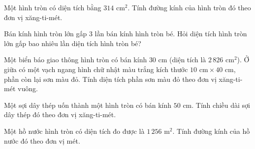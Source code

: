 \begin{ex} %
Một hình tròn có diện tích bằng $314\text{ cm}^2$. Tính đường kính của hình tròn đó theo đơn vị xăng-ti-mét.
\end{ex}

\begin{ex} %
Bán kính hình tròn lớn gấp $3$ lần bán kính hình tròn bé. Hỏi diện tích hình tròn lớn gấp bao nhiêu lần diện tích hình tròn bé?
\end{ex}

\begin{ex} %
Một biển báo giao thông hình tròn có bán kính $30\text{ cm}$ (diện tích là $2\,826\text{ cm}^2$). Ở giữa có một vạch ngang hình chữ nhật màu trắng kích thước $10\text{ cm} \times 40\text{ cm}$, phần còn lại sơn màu đỏ. Tính diện tích phần sơn màu đỏ theo đơn vị xăng-ti-mét vuông.
\end{ex}

\begin{ex} %
Một sợi dây thép uốn thành một hình tròn có bán kính $50\text{ cm}$. Tính chiều dài sợi dây thép đó theo đơn vị xăng-ti-mét.
\end{ex}

\begin{ex} %
Một hồ nước hình tròn có diện tích đo được là $1\,256\text{ m}^2$. Tính đường kính của hồ nước đó theo đơn vị mét.
\end{ex}
